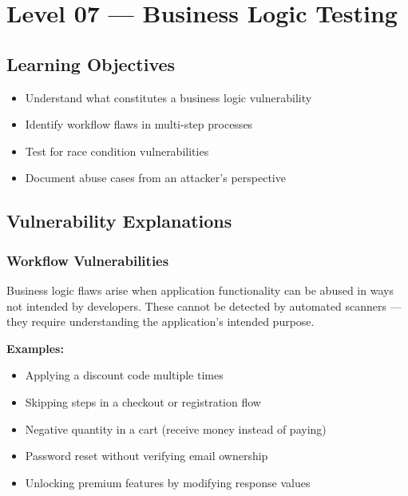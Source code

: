 \chapter{Level 07 — Business Logic Testing}
\label{ch:level07}


\section{Learning Objectives}
\begin{itemize}
  \item Understand what constitutes a business logic vulnerability
  \item Identify workflow flaws in multi-step processes
  \item Test for race condition vulnerabilities
  \item Document abuse cases from an attacker's perspective
\end{itemize}

\section{Vulnerability Explanations}

\subsection{Workflow Vulnerabilities}
Business logic flaws arise when application functionality can be abused in ways not intended by developers. These cannot be detected by automated scanners — they require understanding the application's intended purpose.

\textbf{Examples:}
\begin{itemize}
  \item Applying a discount code multiple times
  \item Skipping steps in a checkout or registration flow
  \item Negative quantity in a cart (receive money instead of paying)
  \item Password reset without verifying email ownership
  \item Unlocking premium features by modifying response values
\end{itemize}

